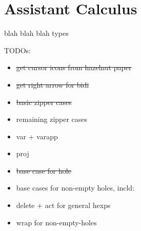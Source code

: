 \section{Assistant Calculus}\label{sec:assistant-calculus}

blah blah blah types

TODOs:
\begin{itemize}
    \item \sout{get cursor icons from hazelnut paper}
    \item \sout{get right arrow for bidi}
    \item \sout{basic zipper cases}
    \item remaining zipper cases
    \item var + varapp
    \item proj
    \item \sout{base case for hole}
    \item base cases for non-empty holes, incld:
    \item delete + act for general hexps
    \item wrap for non-empty-holes
\end{itemize}

\newcommand{\singleton}[1]{\{ #1 \}}
\newcommand{\singleaction}[1]{\singleton{\mathtt{#1}}}

